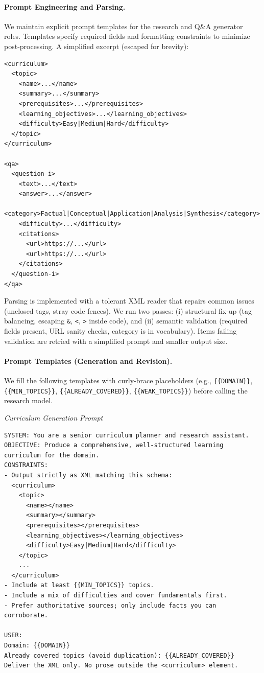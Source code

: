 \documentclass[11pt]{article}
\begin{document}
\paragraph{Prompt Engineering and Parsing.} We maintain explicit prompt templates for the research and Q\&A generator roles. Templates specify required fields and formatting constraints to minimize post-processing. A simplified excerpt (escaped for brevity):
\begin{verbatim}
<curriculum>
  <topic>
    <name>...</name>
    <summary>...</summary>
    <prerequisites>...</prerequisites>
    <learning_objectives>...</learning_objectives>
    <difficulty>Easy|Medium|Hard</difficulty>
  </topic>
</curriculum>

<qa>
  <question-i>
    <text>...</text>
    <answer>...</answer>
    <category>Factual|Conceptual|Application|Analysis|Synthesis</category>
    <difficulty>...</difficulty>
    <citations>
      <url>https://...</url>
      <url>https://...</url>
    </citations>
  </question-i>
</qa>
\end{verbatim}
Parsing is implemented with a tolerant XML reader that repairs common issues (unclosed tags, stray code fences). We run two passes: (i) structural fix-up (tag balancing, escaping \verb|&|, \verb|<|, \verb|>| inside code), and (ii) semantic validation (required fields present, URL sanity checks, category is in vocabulary). Items failing validation are retried with a simplified prompt and smaller output size.

\paragraph{Prompt Templates (Generation and Revision).} We fill the following templates with curly-brace placeholders (e.g., \verb|{{DOMAIN}}|, \verb|{{MIN_TOPICS}}|, \verb|{{ALREADY_COVERED}}|, \verb|{{WEAK_TOPICS}}|) before calling the research model.

\emph{Curriculum Generation Prompt}
\begin{verbatim}
SYSTEM: You are a senior curriculum planner and research assistant.
OBJECTIVE: Produce a comprehensive, well-structured learning curriculum for the domain.
CONSTRAINTS:
- Output strictly as XML matching this schema:
  <curriculum>
    <topic>
      <name></name>
      <summary></summary>
      <prerequisites></prerequisites>
      <learning_objectives></learning_objectives>
      <difficulty>Easy|Medium|Hard</difficulty>
    </topic>
    ...
  </curriculum>
- Include at least {{MIN_TOPICS}} topics.
- Include a mix of difficulties and cover fundamentals first.
- Prefer authoritative sources; only include facts you can corroborate.

USER:
Domain: {{DOMAIN}}
Already covered topics (avoid duplication): {{ALREADY_COVERED}}
Deliver the XML only. No prose outside the <curriculum> element.
\end{verbatim}
\end{document}
